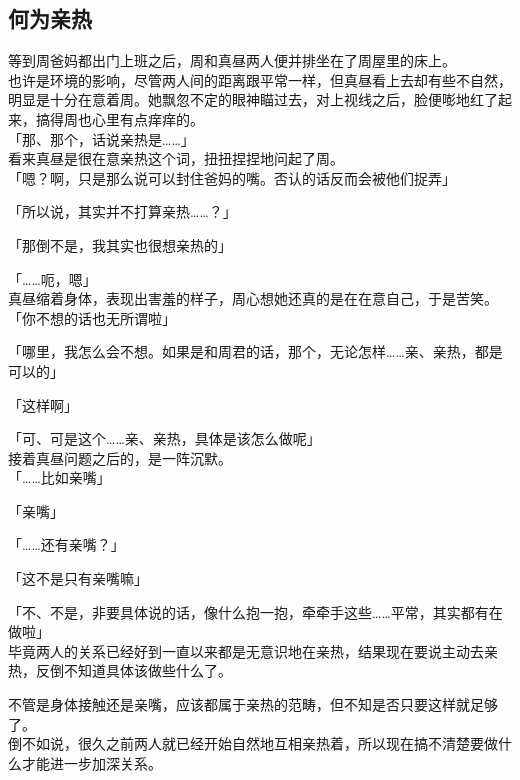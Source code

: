 \subsection{何为亲热}

等到周爸妈都出门上班之后，周和真昼两人便并排坐在了周屋里的床上。\\

也许是环境的影响，尽管两人间的距离跟平常一样，但真昼看上去却有些不自然，明显是十分在意着周。她飘忽不定的眼神瞄过去，对上视线之后，脸便嘭地红了起来，搞得周也心里有点痒痒的。\\

「那、那个，话说亲热是……」\\

看来真昼是很在意亲热这个词，扭扭捏捏地问起了周。\\

「嗯？啊，只是那么说可以封住爸妈的嘴。否认的话反而会被他们捉弄」

「所以说，其实并不打算亲热……？」

「那倒不是，我其实也很想亲热的」

「……呃，嗯」\\

真昼缩着身体，表现出害羞的样子，周心想她还真的是在在意自己，于是苦笑。\\

「你不想的话也无所谓啦」

「哪里，我怎么会不想。如果是和周君的话，那个，无论怎样……亲、亲热，都是可以的」

「这样啊」

「可、可是这个……亲、亲热，具体是该怎么做呢」\\

接着真昼问题之后的，是一阵沉默。\\

「……比如亲嘴」

「亲嘴」

「……还有亲嘴？」

「这不是只有亲嘴嘛」

「不、不是，非要具体说的话，像什么抱一抱，牵牵手这些……平常，其实都有在做啦」\\

毕竟两人的关系已经好到一直以来都是无意识地在亲热，结果现在要说主动去亲热，反倒不知道具体该做些什么了。

不管是身体接触还是亲嘴，应该都属于亲热的范畴，但不知是否只要这样就足够了。\\

倒不如说，很久之前两人就已经开始自然地互相亲热着，所以现在搞不清楚要做什么才能进一步加深关系。\\

